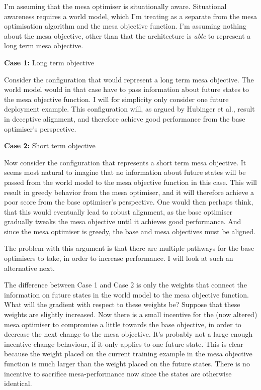 I'm assuming that the mesa optimiser is situationally aware.
Situational awareness requires a world model, which I'm treating as a separate from the mesa optimisation algorithm and
the mesa objective function.
I'm assuming nothing about the mesa objective, other than that the architecture is \emph{able} to represent a long term
mesa objective.

\textbf{Case 1:} Long term objective

Consider the configuration that would represent a long term mesa objective.
The world model would in that case have to pass information about future states to the mesa objective function.
I will for simplicity only consider one future deployment example.
This configuration will, as argued by Hubinger et al.\cite{hubinger2021}, result in deceptive alignment, and therefore
achieve good performance from the base optimiser's perspective.

\textbf{Case 2:} Short term objective

Now consider the configuration that represents a short term mesa objective.
It seems most natural to imagine that no information about future states will be passed from the world model to the mesa
objective function in this case.
This will result in greedy behavior from the mesa optimiser, and it will therefore achieve a poor score from the base
optimiser's perspective.
One would then perhaps think, that this would eventually lead to robust alignment, as the base optimiser gradually
tweaks the mesa objective until it achieves good performance.
And since the mesa optimiser is greedy, the base and mesa objectives must be aligned.

The problem with this argument is that there are multiple pathways for the base optimisers to take, in order to increase
performance.
I will look at such an alternative next.

The difference between Case 1 and Case 2 is only the weights that connect the information on future states in the world
model to the mesa objective function.
What will the gradient with respect to these weights be?
Suppose that these weights are slightly increased.
Now there is a small incentive for the (now altered) mesa optimiser to compromise a little towards the base objective,
in order to decrease the next change to the mesa objective.
It's probably not a large enough incentive change behaviour, if it only applies to one future state.
This is clear because the weight placed on the current training example in the mesa objective function is much larger
than the weight placed on the future states.
There is no incentive to sacrifice mesa-performance now since the states are otherwise identical.

